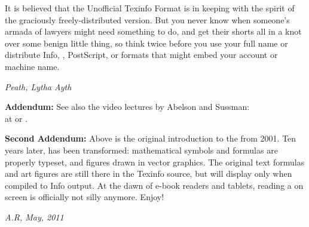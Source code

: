It is believed that the Unofficial Texinfo Format is in keeping with the
spirit of the graciously freely-distributed  version.  But you
never know when someone's armada of lawyers might need something to do, and get
their shorts all in a knot over some benign little thing, so think twice before
you use your full name or distribute Info, , PostScript, or
 formats that might embed your account or machine name.

\vspace{0.5em}
\noindent
\textit{Peath, Lytha Ayth}

\vspace{1.0em}
\noindent
\textbf{Addendum:} See also the  video lectures by Abelson and Sussman:\\
at \href{http://groups.csail.mit.edu/mac/classes/6.001/abelson-sussman-lectures/}{} or
\href{http://ocw.mit.edu/courses/electrical-engineering-and-computer-science/6-001-structure-and-interpretation-of-computer-programs-spring-2005/video-lectures/}{}.

\vspace{0.5em}
\noindent
\textbf{Second Addendum:} Above is the original introduction to the 
from 2001. Ten years later,  has been transformed: mathematical
symbols and formulas are properly typeset, and figures drawn in
vector graphics. The original text formulas and  art figures
are still there in the Texinfo source, but will display only when compiled
to Info output. At the dawn of e-book readers and tablets, reading a
 on screen is officially not silly anymore. Enjoy!

\vspace{0.5em}
\noindent
\textit{A.R, May, 2011}
